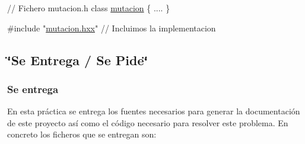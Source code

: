 \begin{DoxyCode}
\textcolor{comment}{// Fichero mutacion.h  }
\textcolor{keyword}{class }\hyperlink{classmutacion}{mutacion} \{
 ....
\}

\textcolor{preprocessor}{#include "\hyperlink{mutacion_8hxx}{mutacion.hxx}"} \textcolor{comment}{// Incluimos la implementacion}
\end{DoxyCode}
\hypertarget{index_sec_tar}{}\subsection{\char`\"{}\+Se Entrega / Se Pide\char`\"{}}\label{index_sec_tar}
\hypertarget{index_ssEntrega}{}\subsubsection{Se entrega}\label{index_ssEntrega}
En esta práctica se entrega los fuentes necesarios para generar la documentación de este proyecto así como el código necesario para resolver este problema. En concreto los ficheros que se entregan son\+:

